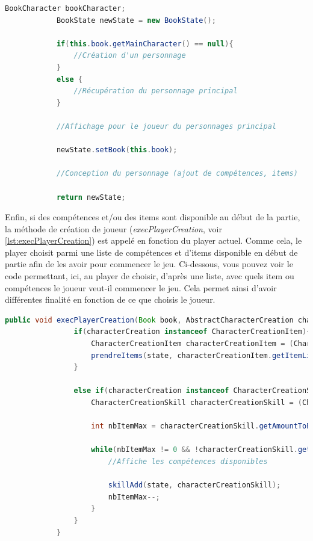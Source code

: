 		\begin{lstlisting}[gobble=12, language=java, caption=createNewState()]
			BookCharacter bookCharacter;
			BookState newState = new BookState();

			if(this.book.getMainCharacter() == null){
				//Création d'un personnage
			}
			else {
				//Récupération du personnage principal
			}

			//Affichage pour le joueur du personnages principal

			newState.setBook(this.book);

			//Conception du personnage (ajout de compétences, items)

			return newState;
		\end{lstlisting}

		Enfin, si des compétences et/ou des items sont disponible au début de la partie, la méthode de création de joueur (\textit{execPlayerCreation}, voir \ref{lst:execPlayerCreation}) est appelé en fonction du player actuel. Comme cela, le player choisit parmi une liste de compétences et d'items disponible en début de partie afin de les avoir pour commencer le jeu. Ci-dessous, vous pouvez voir le code permettant, ici, au player de choisir, d'après une liste, avec quels item ou compétences le joueur veut-il commencer le jeu. Cela permet ainsi d'avoir différentes finalité en fonction de ce que choisis le joueur.\\

		\begin{lstlisting}[gobble=12, language=java, caption=Méthode execPlayerCreation() du player, label=lst:execPlayerCreation]
			public void execPlayerCreation(Book book, AbstractCharacterCreation characterCreation, BookState state){
				if(characterCreation instanceof CharacterCreationItem){
					CharacterCreationItem characterCreationItem = (CharacterCreationItem) characterCreation;
					prendreItems(state, characterCreationItem.getItemLinks(), characterCreationItem.getAmountToPick());
				}

				else if(characterCreation instanceof CharacterCreationSkill){
					CharacterCreationSkill characterCreationSkill = (CharacterCreationSkill) characterCreation;

					int nbItemMax = characterCreationSkill.getAmountToPick();

					while(nbItemMax != 0 && !characterCreationSkill.getSkillLinks().isEmpty()){
						//Affiche les compétences disponibles

						skillAdd(state, characterCreationSkill);
						nbItemMax--;
					}
				}
			}
		\end{lstlisting}


